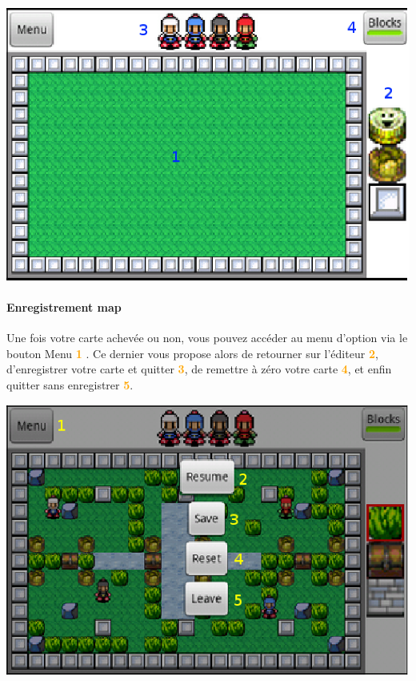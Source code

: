 	
	\begin{center}
		\includegraphics[scale=0.7]{Manuel/Img/11.eps}
	\end{center}
	
	\paragraph{Enregistrement map\\}
	Une fois votre carte achevée ou non, vous pouvez accéder au menu d'option
	via le bouton Menu \textcolor{orange}{\textbf{1}} . Ce dernier vous propose
	alors de retourner sur l'éditeur \textcolor{orange}{\textbf{2}}, d'enregistrer votre
	carte et quitter \textcolor{orange}{\textbf{3}}, de remettre à zéro votre carte
	\textcolor{orange}{\textbf{4}}, et enfin quitter sans enregistrer
	\textcolor{orange}{\textbf{5}}. 
	
	\begin{center}
		\includegraphics[scale=0.7]{Manuel/Img/13.eps}
	\end{center}
	
